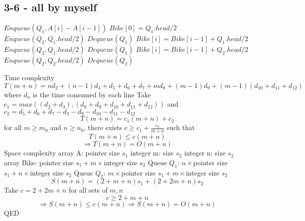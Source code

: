 \documentclass[12pt]{article}
\begin{document}
\subsection*{3-6 - all by myself}
\begin{algorithmic}
    \State $Enqueue(Q_1, A[i]-A[i-1])$
    \EndFor
    \State $Bike[0] = Q_1.head / 2$
    \State $Enqueue(Q_2, Q_1.head/2)$
    \State $Dequeue(Q_1)$
    \State $Bike[i] = Bike[i-1] + Q_1.head / 2$
    \State $Enqueue(Q_2, Q_1.head/2)$
    \State $Dequeue(Q_1)$
    \Else
    \State $Bike[i] = Bike[i-1] + Q_2.head / 2$
    \State $Enqueue(Q_2, Q_2.head/2)$
    \State $Dequeue(Q_2)$
    \EndIf
    \EndFor
    \EndProcedure
\end{algorithmic}
Time complexity
\[T(m + n) = nd_2 + (n-1)d_3 + d_5 + d_6 + d_7 + md_8 + (m-1)d_9 + (m-1)(d_{10}+d_{11}+d_{12})\]
where $d_n$ is the time consumed by each line\newline
Take $c_1 = max((d_2 + d_3), (d_8 + d_9 + d_{10} + d_{11} + d_{12}))$ and $c_2 = d_5 + d_6 + d_7 - d_3 - d_9 - d_{10} - d_{11} - d_{12}$
\[T(m + n) = c_1(m + n) + c_2\]
for all $m \geq m_0$ and $n \geq n_0$, there exists
$c \geq c_1 + \frac{c_2}{m+n}$ such that \[T(m+n) \leq c(m+n)\]
\[\Rightarrow T(m + n) = O(m + n)\]
Space complexity\newline
array A: pointer size $s_1$\newline
integer m: size $s_2$\newline
integer n: size $s_2$\newline
array Bike: pointer size $s_1 +m\times$integer size $s_2$\newline
Queue $Q_1$: $n\times$pointer size $s_1+n\times$integer size $s_2$\newline
Queue $Q_2$: $m\times$pointer size $s_1+m\times$integer size $s_2$\newline
\[S(m+n) = (2+m+n)s_1 + (2+2m+n)s_2\]
Take $c = 2+2m+n$\newline
for all sets of $m,n$
\[c\geq 2+m+n\]
\[\Rightarrow S(m+n)\leq c(m+n) \Rightarrow S(m+n)=O(m+n)\]
QED
\end{document}
